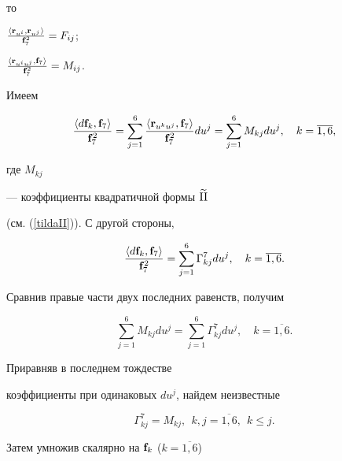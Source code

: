 то


$\frac{\langle


\bold{r}_{u^i},\bold{r}_{u^j}\rangle}{\bold{f}_7^2}=F_{ij


}$;


$\frac{\langle\bold{r}_{u^iu^j},\bold{f}_7\rangle}{\bold{


f}_7^2}=M_{ij}$.


Имеем


$$


\frac{\langle


d\bold{f}_k,\bold{f}_7\rangle}{\bold{f}_7^2}=


\sum\limits_{j=1}^6\frac{


\langle\bold{r}_{u^ku^j},\bold{f}_7\rangle}{\bold{f}_7^2}


du^j=


\sum\limits_{j=1}^6M_{kj}du^j,\quad k=\overline{1,6},


$$


где $M_{kj}$


--- коэффициенты квадратичной формы $\widetilde{\mathrm{II}}$


(см. (\ref{tildaII})). С другой стороны,


$$


\frac{\langle d


\bold{f}_k,\bold{f}_7\rangle}{\bold{f}_7^2}=


\sum\limits_{j=1}^6\Gamma_{kj}^7du^j,


\quad k=\overline{1,6}.


$$


Сравнив правые части двух последних равенств, получим


$$


\sum\limits_{j=1}^6M_{kj}du^j=\sum\limits_{j=1}^6\Gamma_{kj}^7du^j,


\quad k=\overline{1,6}.


$$


Приравняв в последнем тождестве


коэффициенты при одинаковых $du^j$, найдем неизвестные


\begin{equation*}


\Gamma_{kj}^7=M_{kj},\ \ k,j=\overline{1,6},\ \ k\leq j.




\end{equation*}


Затем умножив скалярно на $\bold{f}_k$ ($k=\overline{1,6}$)


